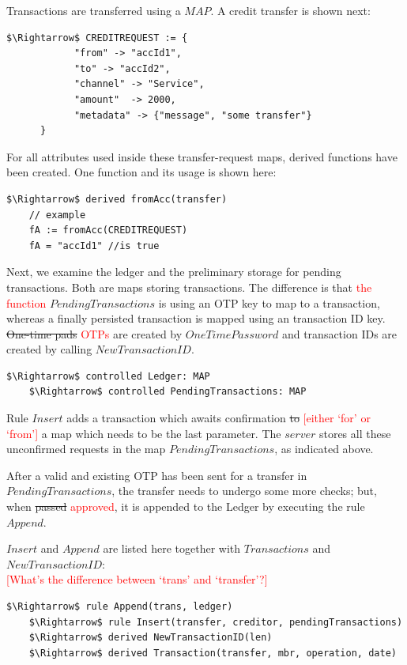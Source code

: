 Transactions are transferred using a $MAP$. A credit transfer is shown next:
\begin{lstlisting}[language=bsl,mathescape=true]
	$\Rightarrow$ CREDITREQUEST := {
			"from" -> "accId1",
			"to" -> "accId2",
			"channel" -> "Service",
			"amount"  -> 2000,
			"metadata" -> {"message", "some transfer"}
	  }	
\end{lstlisting}

For all attributes used inside these transfer-request maps, derived functions have been created. One function and its usage is shown here:
\begin{lstlisting}[language=bsl,mathescape=true]
	$\Rightarrow$ derived fromAcc(transfer)
	// example
	fA := fromAcc(CREDITREQUEST)
	fA = "accId1" //is true
\end{lstlisting}

Next, we examine the ledger and the preliminary storage for pending transactions. Both are maps storing transactions. The difference is that \textcolor{red}{the function} $PendingTransactions$ is using an OTP key to map to a transaction, whereas a finally persisted transaction is mapped using an transaction ID key. \st{One-time pads} \textcolor{red}{OTPs} are created by $OneTimePassword$ and transaction IDs are created by calling $NewTransactionID$.

\begin{lstlisting}[language=bsl,mathescape=true]
	$\Rightarrow$ controlled Ledger: MAP
	$\Rightarrow$ controlled PendingTransactions: MAP
\end{lstlisting}

Rule $Insert$ adds a transaction which awaits confirmation \st{to} \textcolor{red}{[either `for' or `from']} a map which needs to be the last parameter. The $server$ stores all these unconfirmed requests in the map $PendingTransactions$, as indicated above.

After a valid and existing OTP has been sent for a transfer in $PendingTransactions$, the transfer needs to undergo some more checks; but, when \st{passed} \textcolor{red}{approved}, it is appended to the Ledger by executing the rule $Append$.

$Insert$ and $Append$ are listed here together with $Transactions$ and $NewTransactionID$:\\
\textcolor{red}{[What's the difference between `trans' and `transfer'?]}
\begin{lstlisting}[language=bsl,mathescape=true]
	$\Rightarrow$ rule Append(trans, ledger)
	$\Rightarrow$ rule Insert(transfer, creditor, pendingTransactions)
	$\Rightarrow$ derived NewTransactionID(len)
	$\Rightarrow$ derived Transaction(transfer, mbr, operation, date)
\end{lstlisting}

